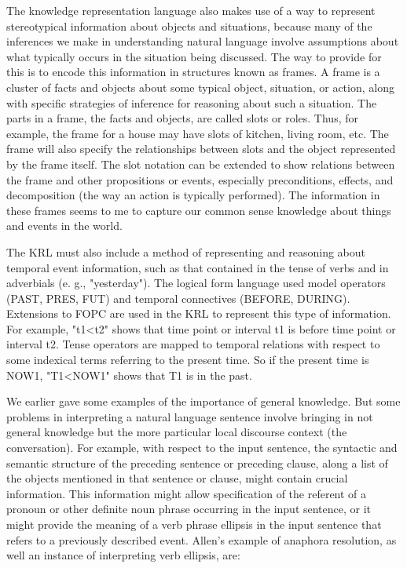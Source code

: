 The knowledge representation language also makes use of a way to represent stereotypical information about objects and situations, because many of the inferences we make in understanding natural language involve assumptions about what typically occurs in the situation being discussed. The way to provide for this is to encode this information in structures known as frames. A frame is a cluster of facts and objects about some typical object, situation, or action, along with specific strategies of inference for reasoning about such a situation. The parts in a frame, the facts and objects, are called slots or roles. Thus, for example, the frame for a house may have slots of kitchen, living room, etc. The frame will also specify the relationships between slots and the object represented by the frame itself. The slot notation can be extended to show relations between the frame and other propositions or events, especially preconditions, effects, and decomposition (the way an action is typically performed). The information in these frames seems to me to capture our common sense knowledge about things and events in the world.

The KRL must also include a method of representing and reasoning about temporal event information, such as that contained in the tense of verbs and in adverbials (e. g., "yesterday"). The logical form language used model operators (PAST, PRES, FUT) and temporal connectives (BEFORE, DURING). Extensions to FOPC are used in the KRL to represent this type of information. For example, "t1<t2" shows that time point or interval t1 is before time point or interval t2. Tense operators are mapped to temporal relations with respect to some indexical terms referring to the present time. So if the present time is NOW1, "T1<NOW1" shows that T1 is in the past.

We earlier gave some examples of the importance of general knowledge. But some problems in interpreting a natural language sentence involve bringing in not general knowledge but the more particular local discourse context (the conversation). For example, with respect to the input sentence, the syntactic and semantic structure of the preceding sentence or preceding clause, along a list of the objects mentioned in that sentence or clause, might contain crucial information. This information might allow specification of the referent of a pronoun or other definite noun phrase occurring in the input sentence, or it might provide the meaning of a verb phrase ellipsis in the input sentence that refers to a previously described event. Allen's example of anaphora resolution, as well an instance of interpreting verb ellipsis, are:

